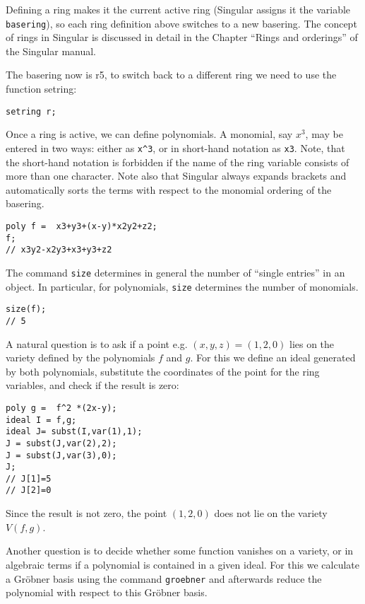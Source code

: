 \documentclass[12pt]{amsart}
\begin{document}
Defining a ring makes it the current active ring (Singular assigns it the variable  \verb+basering+), so each ring definition above switches to a new basering. 
The concept of rings in Singular is discussed in detail in the Chapter ``Rings and orderings'' of the Singular manual.

The basering now is r5, to switch back to a different ring we need to use  
the function setring:

\begin{verbatim}
setring r;
\end{verbatim}

Once a ring is active, we can define polynomials. A monomial, say $x^3$, may be entered in two ways: 
either as \verb+x^3+, or in short-hand notation as \verb+x3+. Note, that the short-hand notation is forbidden if 
the name of the ring variable consists of more than one character. 
Note also that Singular always expands brackets and automatically sorts the terms with respect to the monomial ordering of the basering.

\begin{verbatim}
poly f =  x3+y3+(x-y)*x2y2+z2;
f;
// x3y2-x2y3+x3+y3+z2
\end{verbatim}

The command \texttt{size} determines in general the number of ``single entries'' in an object. 
In particular, for polynomials, \texttt{size} determines the number of monomials.

\begin{verbatim}
size(f);
// 5
\end{verbatim}

A natural question is to ask if a point e.g. $(x,y,z)=(1,2,0)$ lies on the variety defined by the polynomials $f$ and $g$. 
For this we define an ideal generated by both polynomials, substitute the coordinates of the point for the ring variables, 
and check if the result is zero:

\begin{verbatim}
poly g =  f^2 *(2x-y);
ideal I = f,g;
ideal J= subst(I,var(1),1);
J = subst(J,var(2),2);
J = subst(J,var(3),0);
J;
// J[1]=5
// J[2]=0
\end{verbatim}

Since the result is not zero, the point $(1,2,0)$ does not lie on the variety $V(f,g)$.

Another question is to decide whether some function vanishes on a variety, 
or in algebraic terms if a polynomial is contained in a given ideal. For this we calculate 
a Gr\"obner basis using the command \texttt{groebner} and afterwards reduce the polynomial 
with respect to this Gr\"obner basis.
\end{document}
